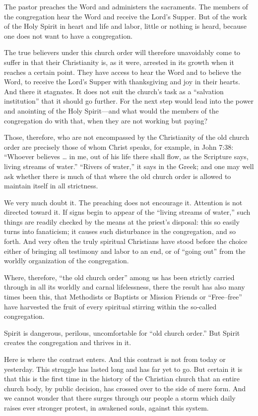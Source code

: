 The pastor preaches the Word and administers the sacraments. The members of the congregation hear the Word and receive the Lord’s Supper. But of the work of the Holy Spirit in heart and life and labor, little or nothing is heard, because one does not want to have a congregation.

The true believers under this church order will therefore unavoidably come to suffer in that their Christianity is, as it were, arrested in its growth when it reaches a certain point. They have access to hear the Word and to believe the Word, to receive the Lord’s Supper with thanksgiving and joy in their hearts. And there it stagnates. It does not suit the church’s task as a “salvation institution” that it should go further. For the next step would lead into the power and anointing of the Holy Spirit—and what would the members of the congregation do with that, when they are not working but paying?

Those, therefore, who are not encompassed by the Christianity of the old church order are precisely those of whom Christ speaks, for example, in John 7:38: “Whoever believes … in me, out of his life there shall flow, as the Scripture says, living streams of water.” “Rivers of water,” it says in the Greek; and one may well ask whether there is much of that where the old church order is allowed to maintain itself in all strictness.

We very much doubt it. The preaching does not encourage it. Attention is not directed toward it. If signs begin to appear of the “living streams of water,” such things are readily checked by the means at the priest’s disposal: this so easily turns into fanaticism; it causes such disturbance in the congregation, and so forth. And very often the truly spiritual Christians have stood before the choice either of bringing all testimony and labor to an end, or of “going out” from the worldly organization of the congregation.

Where, therefore, “the old church order” among us has been strictly carried through in all its worldly and carnal lifelessness, there the result has also many times been this, that Methodists or Baptists or Mission Friends or “Free–free” have harvested the fruit of every spiritual stirring within the so‑called congregation.

Spirit is dangerous, perilous, uncomfortable for “old church order.” But Spirit creates the congregation and thrives in it.

Here is where the contrast enters. And this contrast is not from today or yesterday. This struggle has lasted long and has far yet to go. But certain it is that this is the first time in the history of the Christian church that an entire church body, by public decision, has crossed over to the side of mere form. And we cannot wonder that there surges through our people a storm which daily raises ever stronger protest, in awakened souls, against this system.

